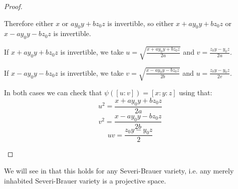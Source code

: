 \begin{proof}
\begin{itemize}
Therefore either $x$ or $ay_0y+bz_0z$ is invertible, so either $x+ay_0y+bz_0z$ or $x-ay_0y-bz_0z$ is invertible.

If $x+ay_0y+bz_0z$ is invertible, we take $u=\sqrt{\frac{x+ay_0y+bz_0z}{2a}}$ and $v = \frac{z_0y-y_0z}{2u}$.

If $x-ay_0y-bz_0z$ is invertible, we take $v=\sqrt{\frac{x-ay_0y-bz_0z}{2b}}$ and $u = \frac{z_0y-y_0z}{2v}$.

In both cases we can check that $\psi([u:v]) = [x:y:z]$ using that:
\[u^2 = \frac{x+ay_0y+bz_0z}{2a}\]
\[v^2 = \frac{x-ay_0y-bz_0z}{2b}\]
\[uv = \frac{z_0y-y_0z}{2}\]
\end{itemize}
\end{proof}


\begin{remark}
We will see in  that this holds for any Severi-Brauer variety, i.e. any merely inhabited Severi-Brauer variety is a projective space. 
\end{remark}